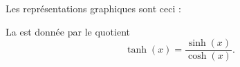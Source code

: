 Les représentations graphiques sont ceci :
\begin{center}
   
\end{center}

La  est donnée par le quotient
\begin{equation}
    \tanh(x)=\frac{ \sinh(x) }{ \cosh(x) }.
\end{equation}

